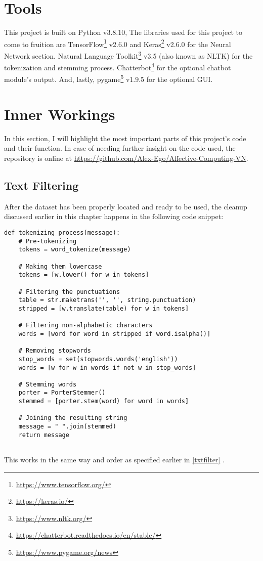 \section{Tools}
This project is built on Python v3.8.10, The libraries used for this project to come to fruition are TensorFlow\footnote{\url{https://www.tensorflow.org/}} v2.6.0 and Keras\footnote{\url{https://keras.io/}} v2.6.0 for the Neural Network section. Natural Language Toolkit\footnote{\url{https://www.nltk.org/}} v3.5 (also known as NLTK) for the tokenization and stemming process. Chatterbot\footnote{\url{https://chatterbot.readthedocs.io/en/stable/}} for the optional chatbot module's output. And, lastly, pygame\footnote{\url{https://www.pygame.org/news}} v1.9.5 for the optional GUI.

\section{Inner Workings}
In this section, I will highlight the most important parts of this project's code and their function. In case of needing further insight on the code used, the repository is online at \url{https://github.com/Alex-Ego/Affective-Computing-VN}.
\subsection{Text Filtering}
After the dataset has been properly located and ready to be used, the cleanup discussed earlier in this chapter happens in the following code snippet:
\begin{lstlisting}
def tokenizing_process(message):
    # Pre-tokenizing
    tokens = word_tokenize(message)
    
    # Making them lowercase
    tokens = [w.lower() for w in tokens]
    
    # Filtering the punctuations
    table = str.maketrans('', '', string.punctuation)
    stripped = [w.translate(table) for w in tokens]
    
    # Filtering non-alphabetic characters
    words = [word for word in stripped if word.isalpha()]
    
    # Removing stopwords
    stop_words = set(stopwords.words('english'))
    words = [w for w in words if not w in stop_words]
    
    # Stemming words
    porter = PorterStemmer()
    stemmed = [porter.stem(word) for word in words]
    
    # Joining the resulting string
    message = " ".join(stemmed)
    return message
    
\end{lstlisting}
This works in the same way and order as specified earlier in \ref{txtfilter} .
